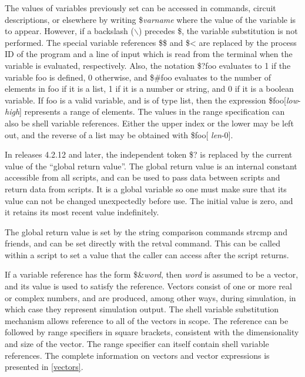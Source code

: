 The values of variables previously set can be accessed in commands,
circuit descriptions, or elsewhere by writing {\vt \$}{\it varname\/}
where the value of the variable is to appear.  However, if a backslash
({\vt $\backslash$}) precedes {\vt \$}, the variable substitution is not
performed.  The special variable references {\vt \$\$} and {\vt \$<}
are replaced by the process ID of the program and a line of input
which is read from the terminal when the variable is evaluated,
respectively.  Also, the notation {\vt \$?foo} evaluates to 1 if the
variable {\vt foo} is defined, 0 otherwise, and {\vt \$\#foo}
evaluates to the number of elements in {\vt foo} if it is a list, 1 if
it is a number or string, and 0 if it is a boolean variable.  If {\vt
foo} is a valid variable, and is of type list, then the expression
{\vt \$foo}[{\it low\/}-{\it high\/}] represents a range of elements. 
The values in the range specification {\vt [...]} can also be shell
variable references.  Either the upper index or the lower may be left
out, and the reverse of a list may be obtained with {\vt \$foo}[{\it
len\/}-0].

In releases 4.2.12 and later, the independent token {\vt \$?} is
replaced by the current value of the ``global return value''.  The
global return value is an internal constant accessible from all
scripts, and can be used to pass data between scripts and return data
from scripts.  It is a global variable so one must make sure that its
value can not be changed unexpectedly before use.  The initial value
is zero, and it retains its most recent value indefinitely.

The global return value is set by the string comparison commands {\cb
strcmp} and friends, and can be set directly with the {\cb retval}
command.  This can be called within a script to set a value that the
caller can access after the script returns.

If a variable reference has the form {\vt \$\&{\it word\/}}, then {\it
word\/} is assumed to be a vector, and its value is used to satisfy
the reference.  Vectors consist of one or more real or complex
numbers, and are produced, among other ways, during simulation, in
which case they represent simulation output.  The shell variable
substitution mechanism allows reference to all of the vectors in
scope.  The reference can be followed by range specifiers in square
brackets, consistent with the dimensionality and size of the vector. 
The range specifier can itself contain shell variable references.  The
complete information on vectors and vector expressions is presented in
\ref{vectors}.

